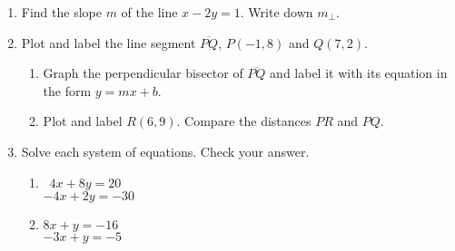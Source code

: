 \documentclass[12pt, twoside]{article}
\begin{document}
\begin{enumerate}
\item Find the slope $m$ of the line $x-2y=1$. Write down $m_{\perp}$.  \vspace{2cm}

\newpage
\item Plot and label the line segment $\overline{PQ}$, $P(-1,8)$ and $Q(7,2)$.
  \begin{enumerate}
    \item Graph the perpendicular bisector of $\overline{PQ}$ and label it with its equation in the form $y=mx+b$.  \vspace{1cm} 
    \item Plot and label $R(6,9)$. Compare the distances $PR$ and $PQ$.
  \end{enumerate} 
  \begin{flushright} %
  \end{flushright}

\item Solve each system of equations. Check your answer.
  \begin{multicols}{2}
    \begin{enumerate}
      \item \, $4x+8y=20$\\
      $-4x+2y=-30$
      \item \quad $8x+y=-16$\\
      $-3x+y=-5$
    \end{enumerate}
  \end{multicols}
  
\end{enumerate}
\end{document}
